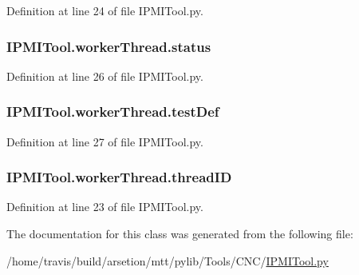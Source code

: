 Definition at line 24 of file I\-P\-M\-I\-Tool.\-py.

\hypertarget{classIPMITool_1_1workerThread_a611bfcde0fa8d328904fde134bde0d87}{
\subsubsection[{status}]{\setlength{\rightskip}{0pt plus 5cm}I\-P\-M\-I\-Tool.\-worker\-Thread.\-status}}\label{classIPMITool_1_1workerThread_a611bfcde0fa8d328904fde134bde0d87}


Definition at line 26 of file I\-P\-M\-I\-Tool.\-py.

\hypertarget{classIPMITool_1_1workerThread_a83638bfbceb196edbfd06990e230cd8e}{
\subsubsection[{test\-Def}]{\setlength{\rightskip}{0pt plus 5cm}I\-P\-M\-I\-Tool.\-worker\-Thread.\-test\-Def}}\label{classIPMITool_1_1workerThread_a83638bfbceb196edbfd06990e230cd8e}


Definition at line 27 of file I\-P\-M\-I\-Tool.\-py.

\hypertarget{classIPMITool_1_1workerThread_ad9622aa9a06ed124fa430c7f57335335}{
\subsubsection[{thread\-I\-D}]{\setlength{\rightskip}{0pt plus 5cm}I\-P\-M\-I\-Tool.\-worker\-Thread.\-thread\-I\-D}}\label{classIPMITool_1_1workerThread_ad9622aa9a06ed124fa430c7f57335335}


Definition at line 23 of file I\-P\-M\-I\-Tool.\-py.



The documentation for this class was generated from the following file\-:\begin{DoxyCompactItemize}
\item 
/home/travis/build/arsetion/mtt/pylib/\-Tools/\-C\-N\-C/\hyperlink{IPMITool_8py}{I\-P\-M\-I\-Tool.\-py}\end{DoxyCompactItemize}
